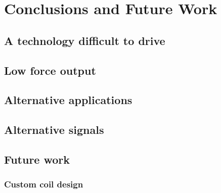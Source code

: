 
\chapter{Conclusions and Future Work}
\label{Chapter6}
    
\section{A technology difficult to drive}

\section{Low force output}

\section{Alternative applications}

\section{Alternative signals}

\section{Future work}

\subsection{Custom coil design}
 